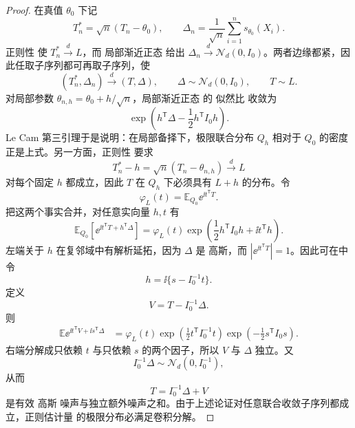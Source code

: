 \begin{proof}
在真值 $\theta_0$ 下记
\[
 T_n^*=\sqrt n(T_n-\theta_0),
 \qquad
 \Delta_n=\frac1{\sqrt n}\sum_{i=1}^ns_{\theta_0}(X_i).
\]
正则性 使 $T_n^*\xrightarrow{d} L$，而 局部渐近正态 给出 $\Delta_n\xrightarrow{d}\mathcal N_d(0,I_0)$。两者边缘都紧，因此任取子序列都可再取子序列，使
\[
 (T_n^*,\Delta_n)\xrightarrow{d}(T,\Delta),
 \qquad
 \Delta\sim\mathcal N_d(0,I_0),
 \qquad
 T\sim L.
\]
对局部参数 $\theta_{n,h}=\theta_0+h/\sqrt n$，局部渐近正态 的 似然比 收敛为
\[
 \exp\!\left(h^{\mathsf T}\Delta-
 \frac12h^{\mathsf T}I_0h\right).
\]
Le Cam 第三引理于是说明：在局部备择下，极限联合分布 $Q_h$ 相对于 $Q_0$ 的密度正是上式。另一方面，正则性 要求
\[
 T_n^*-h
 =\sqrt n(T_n-\theta_{n,h})
 \xrightarrow{d} L
\]
对每个固定 $h$ 都成立，因此 $T$ 在 $Q_h$ 下必须具有 $L+h$ 的分布。令
\[
 \varphi_L(t)=\mathbb E_{Q_0}\ee^{\ii t^{\mathsf T}T}.
\]
把这两个事实合并，对任意实向量 $h,t$ 有
\begin{equation}\label{eq:math-stat-convolution-transform-identity}
 \mathbb E_{Q_0}\!\left[
 \ee^{\ii t^{\mathsf T}T+h^{\mathsf T}\Delta}
 \right]
 =\varphi_L(t)
 \exp\!\left(
 \frac12h^{\mathsf T}I_0h
 +\ii t^{\mathsf T}h
 \right).
\end{equation}
左端关于 $h$ 在复邻域中有解析延拓，因为 $\Delta$ 是 高斯，而 $|\ee^{\ii t^{\mathsf T}T}|=1$。因此可在中令
\[
 h=\ii\{s-I_0^{-1}t\}.
\]
定义
\[
 V=T-I_0^{-1}\Delta.
\]
则
\begin{align*}
 \mathbb E\ee^{\ii t^{\mathsf T}V+\ii s^{\mathsf T}\Delta}
 &=\varphi_L(t)
 \exp\!\left(\frac12t^{\mathsf T}I_0^{-1}t\right)
 \exp\!\left(-\frac12s^{\mathsf T}I_0s\right).
\end{align*}
右端分解成只依赖 $t$ 与只依赖 $s$ 的两个因子，所以 $V$ 与 $\Delta$ 独立。又
\[
 I_0^{-1}\Delta\sim\mathcal N_d(0,I_0^{-1}),
\]
从而
\[
 T=I_0^{-1}\Delta+V
\]
是有效 高斯 噪声与独立额外噪声之和。由于上述论证对任意联合收敛子序列都成立，正则估计量 的极限分布必满足卷积分解。
\end{proof}

